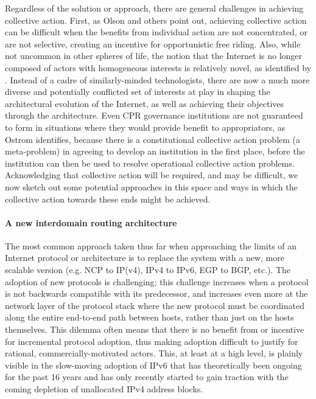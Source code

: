 Regardless of the solution or approach, there are general challenges in
achieving collective action. First, as Olson \cite{Olson:1982ly} and others
point out, achieving collective action can be difficult when the benefits from
individual action are not concentrated, or are not selective, creating an
incentive for opportunistic free riding. Also, while not uncommon in other
spheres of life, the notion that the Internet is no longer composed of actors
with homogeneous interests is relatively novel, as identified by
\cite{Clark:2005rt}. Instead of a cadre of similarly-minded technologists,
there are now a much more diverse and potentially conflicted set of interests
at play in shaping the architectural evolution of the Internet, as well as
achieving their objectives through the architecture. Even CPR governance
institutions are not guaranteed to form in situations where they would provide
benefit to appropriators, as Ostrom \cite{Ostrom:1990fv} identifies, because
there is a constitutional collective action problem (a meta-problem) in
agreeing to develop an institution in the first place, before the institution
can then be used to resolve operational collective action problems.
Acknowledging that collective action will be required, and may be difficult, we
now sketch out some potential approaches in this space and ways in which the
collective action towards these ends might be achieved.

\paragraph{A new interdomain routing architecture}

The most common approach taken thus far when approaching the limits of an
Internet protocol or architecture is to replace the system with a new, more
scalable version (e.g.  NCP to IP(v4), IPv4 to IPv6, EGP to BGP, etc.). The
adoption of new protocols is challenging; this challenge increases when a
protocol is not backwards compatible with its predecessor, and increases even
more at the network layer of the protocol stack where the new protocol must be
coordinated along the entire end-to-end path between hosts, rather than just on
the hosts themselves. This dilemma often means that there is no benefit from or
incentive for incremental protocol adoption, thus making adoption difficult to
justify for rational, commercially-motivated actors. This, at least at a high
level, is plainly visible in the slow-moving adoption of IPv6
\cite{Cowie:2010vn} that has theoretically been ongoing for the past 16 years
\cite{rfc1883} and has only recently started to gain traction with the
coming depletion of unallocated IPv4 address blocks.

